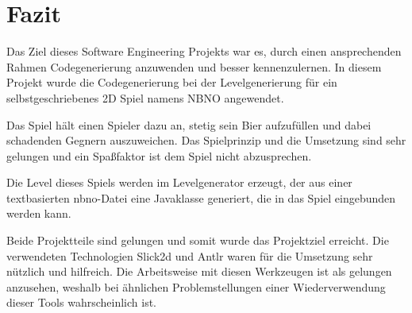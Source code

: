 \section{Fazit}

Das Ziel dieses Software Engineering Projekts war es, durch einen ansprechenden Rahmen Codegenerierung anzuwenden und besser kennenzulernen. In diesem Projekt wurde die Codegenerierung bei der Levelgenerierung für ein selbstgeschriebenes 2D Spiel namens NBNO angewendet.

Das Spiel hält einen Spieler dazu an, stetig sein Bier aufzufüllen und dabei schadenden Gegnern auszuweichen. Das Spielprinzip und die Umsetzung sind sehr gelungen und ein Spaßfaktor ist dem Spiel nicht abzusprechen.

Die Level dieses Spiels werden im Levelgenerator erzeugt, der aus einer textbasierten nbno-Datei eine Javaklasse generiert, die in das Spiel eingebunden werden kann.

Beide Projektteile sind gelungen und somit wurde das Projektziel erreicht. Die verwendeten Technologien Slick2d und Antlr waren für die Umsetzung sehr nützlich und hilfreich. Die Arbeitsweise mit diesen Werkzeugen ist als gelungen anzusehen, weshalb bei ähnlichen Problemstellungen einer Wiederverwendung dieser Tools wahrscheinlich ist.